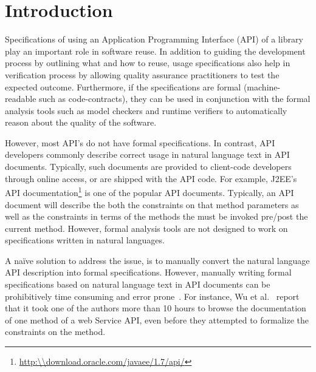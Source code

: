 \section{Introduction}
\label{sec:introduction}









Specifications of using an Application Programming Interface (API) of a library play an important role in software reuse.
In addition to guiding the development process by outlining what and how to reuse, 
usage specifications also help in verification process by allowing quality assurance practitioners to test the expected outcome.
Furthermore, if the specifications are formal (machine-readable such as code-contracts),
they can be used in conjunction with the formal analysis tools such as model checkers and runtime verifiers
to automatically reason about the quality of the software.


However, most API's do not have formal specifications.
In contrast, API developers commonly describe correct usage in natural language text in API documents.
Typically, such documents are provided to client-code developers through online access, or are shipped with the API code.
For example, J2EE's API documentation\footnote{\url{http:\\download.oracle.com/javaee/1.7/api/}} is one of the popular API documents.
Typically, an API document will describe the both the constraints on that method parameters as well as the constraints in terms of the methods the must be invoked pre/post the current method.
However, formal analysis tools are not designed to work on specifications written in natural languages.


A na{\"i}ve solution to address the issue, is to manually convert the natural language API description into formal specifications. 
However, manually writing formal specifications based on natural language text in API documents can be prohibitively time consuming and error prone~\cite{wu2013inferring,RubingerWEB10}. 
For instance, Wu et al.~\cite{wu2013inferring} report that it took one of the authors more than 10 hours to browse the documentation of one method of a web Service API, even before they attempted to formalize the constraints on the method.

